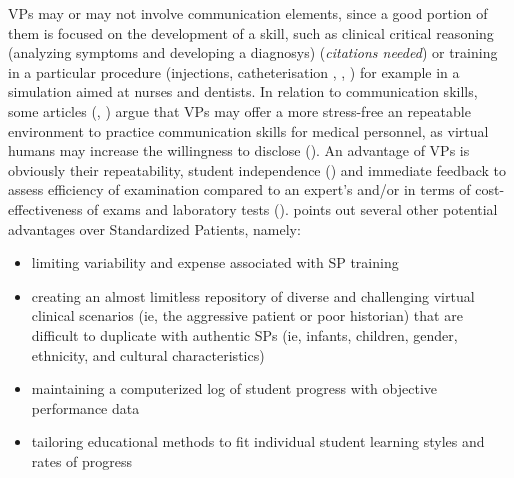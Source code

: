 VPs may or may not involve communication elements, since a good portion of them is focused on the development of a skill, such as clinical critical reasoning (analyzing symptoms and developing a diagnosys) (\emph{citations needed}) or training in a particular procedure (injections, catheterisation \cite{ismailoglu2018comparison}, \cite{engum2003intravenous}, \cite{jung2012evaluation}) for example in a simulation aimed at nurses and dentists.
In relation to communication skills, some articles (\cite{morency2015simsensei}, \cite{stevens2006use}) argue that VPs may offer a more stress-free an repeatable environment to practice communication skills for medical personnel, as virtual humans may increase the willingness to disclose (\cite{lucas2014s}).
An advantage of VPs is obviously their repeatability, student independence (\cite{cook2010computerized}) and immediate feedback to assess efficiency of examination compared to an expert's and/or in terms of cost-effectiveness of exams and laboratory tests (\cite{cook2009virtual}). 
\cite{stevens2006use} points out several other potential advantages over Standardized Patients, namely:
\begin{itemize}
    \item limiting variability and expense associated with SP training
    \item creating an almost limitless repository of diverse and challenging virtual clinical scenarios (ie, the aggressive patient or poor historian) that are difficult to duplicate with authentic SPs (ie, infants, children, gender, ethnicity, and cultural characteristics)
    \item maintaining a computerized log of student progress with objective performance data
    \item tailoring educational methods to fit individual student learning styles and rates of progress 
\end{itemize}{}

